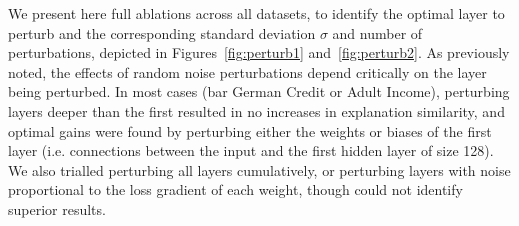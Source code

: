 We present here full ablations across all datasets, to identify the optimal layer to perturb and the corresponding standard deviation $\sigma$ and number of perturbations, depicted in Figures~\ref{fig:perturb1} and~\ref{fig:perturb2}. As previously noted, the effects of random noise perturbations depend critically on the layer being perturbed. In most cases (bar German Credit or Adult Income), perturbing layers deeper than the first resulted in no increases in explanation similarity, and optimal gains were found by perturbing either the weights or biases of the first layer (i.e. connections between the input and the first hidden layer of size 128). We also trialled perturbing all layers cumulatively, or perturbing layers with noise proportional to the loss gradient of each weight, though could not identify superior results.

